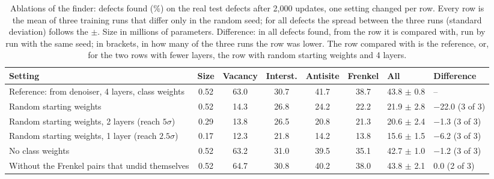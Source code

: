 \begin{table}[t]
\centering
\caption{Ablations of the finder: defects found (\%) on the real test defects after 2,000 updates, one setting changed per row. Every row is the mean of three training runs that differ only in the random seed; for all defects the spread between the three runs (standard deviation) follows the $\pm$. Size in millions of parameters. Difference: in all defects found, from the row it is compared with, run by run with the same seed; in brackets, in how many of the three runs the row was lower. The row compared with is the reference, or, for the two rows with fewer layers, the row with random starting weights and 4 layers.}
\label{tab:ablations}
\footnotesize\setlength{\tabcolsep}{3.2pt}
\begin{tabularx}{\linewidth}{@{}>{\raggedright\arraybackslash}Xcccccll@{}}
\toprule
Setting & Size & Vacancy & Interst. & Antisite & Frenkel & All & Difference \\
\midrule
Reference: from denoiser, 4 layers, class weights & 0.52 & 63.0 & 30.7 & 41.7 & 38.7 & 43.8 $\pm$ 0.8 & -- \\
\addlinespace
Random starting weights & 0.52 & 14.3 & 26.8 & 24.2 & 22.2 & 21.9 $\pm$ 2.8 & $-$22.0 (3 of 3) \\
Random starting weights, 2 layers (reach $5\sigma$) & 0.29 & 13.8 & 26.5 & 20.8 & 21.3 & 20.6 $\pm$ 2.4 & $-$1.3 (3 of 3) \\
Random starting weights, 1 layer (reach $2.5\sigma$) & 0.17 & 12.3 & 21.8 & 14.2 & 13.8 & 15.6 $\pm$ 1.5 & $-$6.2 (3 of 3) \\
\addlinespace
No class weights & 0.52 & 63.2 & 31.0 & 39.5 & 35.1 & 42.7 $\pm$ 1.0 & $-$1.2 (3 of 3) \\
Without the Frenkel pairs that undid themselves & 0.52 & 64.7 & 30.8 & 40.2 & 38.0 & 43.8 $\pm$ 2.1 & 0.0 (2 of 3) \\
\bottomrule
\end{tabularx}
\end{table}
